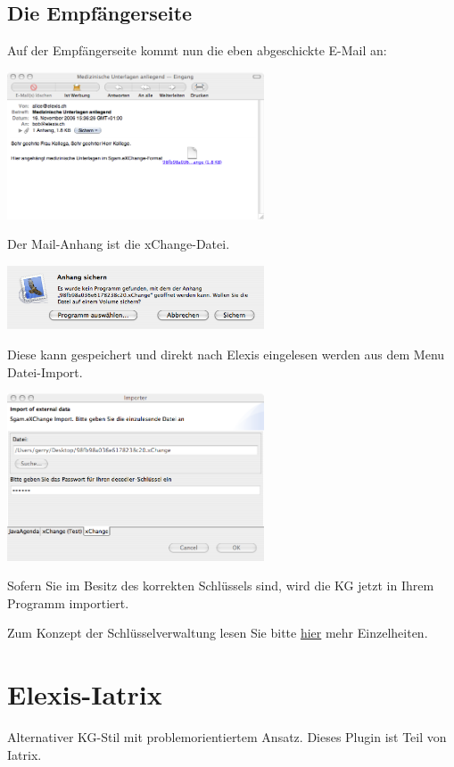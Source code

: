\subsection{Die Empfängerseite}
Auf der Empfängerseite kommt nun die eben abgeschickte E-Mail an:

\includegraphics[width=3in]{images/import1.png}

Der Mail-Anhang ist die xChange-Datei.

\includegraphics[width=3in]{images/import2.png}

Diese kann gespeichert und direkt nach Elexis eingelesen werden aus dem Menu Datei-Import.

\includegraphics[width=3in]{images/import3.png}



Sofern Sie im Besitz des korrekten Schlüssels sind, wird die KG jetzt in Ihrem Programm importiert.

Zum Konzept der Schlüsselverwaltung lesen Sie bitte \href{http://www.elexis.ch/jp/index.php?option=content&task=view&id=64}{hier} mehr Einzelheiten.


\section{Elexis-Iatrix}
Alternativer KG-Stil mit problemorientiertem Ansatz. Dieses Plugin ist Teil von Iatrix.

